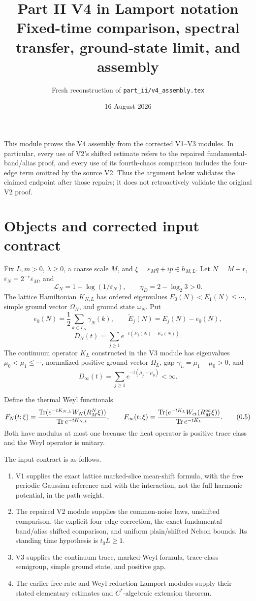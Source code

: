 \documentclass[11pt,a4paper]{article}
\title{Part II V4 in Lamport notation\\[3pt]
\large Fixed-time comparison, spectral transfer, ground-state limit, and assembly}
\author{Fresh reconstruction of \texttt{part\_ii/v4\_assembly.tex}}
\date{16 August 2026}
\newcommand{\eps}{\varepsilon}
\newcommand{\Tr}{\operatorname{Tr}}
\newcommand{\logN}{\mathcal L_N}
\begin{document}
\maketitle

\begin{resultbox}
This module proves the V4 assembly from the corrected V1--V3 modules.  In
particular, every use of V2's shifted estimate refers to the repaired
fundamental-band/alias proof, and every use of its fourth-chaos comparison includes
the four-edge term omitted by the source V2.  Thus the argument below validates the
claimed endpoint after those repairs; it does not retroactively validate the original
V2 proof.
\end{resultbox}
\tableofcontents

\section{Objects and corrected input contract}

Fix $L,m>0$, $\lambda\ge0$, a coarse scale $M$, and
$\xi=\eps_Mq+ip\in h_{M,L}$.  Let $N=M+r$, $\eps_N=2^{-r}\eps_M$, and
\[
 \logN=1+\log(1/\eps_N),\qquad
 \eta_D=2-\log_2 3>0.
\tag{0.1}
\]
The lattice Hamiltonian $K_{N,L}$ has ordered eigenvalues
$E_0(N)<E_1(N)\le\cdots$, simple ground vector $\Omega_N$, and ground state
$\omega_N$.  Put
\[
 e_0(N)=\frac12\sum_{k\in\Gamma_N}\gamma_N(k),\qquad
 \widetilde E_j(N)=E_j(N)-e_0(N),
\tag{0.2}
\]
\[
 D_N(t)=\sum_{j\ge1}e^{-t(E_j(N)-E_0(N))}.
\tag{0.3}
\]
The continuum operator $K_L$ constructed in the V3 module has eigenvalues
$\mu_0<\mu_1\le\cdots$, normalized positive ground vector $\Omega_L$, gap
$\gamma_L=\mu_1-\mu_0>0$, and
\[
 D_\infty(t)=\sum_{j\ge1}e^{-t(\mu_j-\mu_0)}<\infty.
\tag{0.4}
\]

Define the thermal Weyl functionals
\[
 F_N(t;\xi)=
 \frac{\Tr(e^{-tK_{N,L}}W_N(R_M^N\xi))}{\Tr e^{-tK_{N,L}}},\qquad
 F_\infty(t;\xi)=
 \frac{\Tr(e^{-tK_L}W_{\rm ct}(R_M^\infty\xi))}{\Tr e^{-tK_L}}.
\tag{0.5}
\]
Both have modulus at most one because the heat operator is positive trace class and
the Weyl operator is unitary.

The input contract is as follows.

\begin{enumerate}
\item V1 supplies the exact lattice marked-slice mean-shift formula, with the free
periodic Gaussian reference and with the interaction, not the full harmonic
potential, in the path weight.
\item The repaired V2 module supplies the common-noise laws, unshifted comparison,
the explicit four-edge correction, the exact fundamental-band/alias shifted
comparison, and uniform plain/shifted Nelson bounds.  Its standing time hypothesis is
$t_0L\ge1$.
\item V3 supplies the continuum trace, marked-Weyl formula, trace-class semigroup,
simple ground state, and positive gap.
\item The earlier free-rate and Weyl-reduction Lamport modules supply their stated
elementary estimates and $C^*$-algebraic extension theorem.
\end{enumerate}
\end{document}
